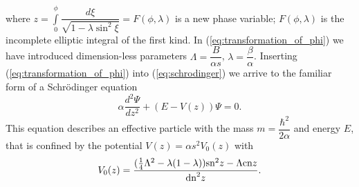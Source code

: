 \documentclass[aps, pre, preprint, groupedaddress, superscriptaddress, showkeys, showpacs] {revtex4-1}
\begin{document}
%
where $z = \int \limits_0^\phi \dfrac{d \xi}{\sqrt{1 - \lambda \sin^2 \xi}} = F(\phi, \lambda)$ is a new phase variable; $F(\phi, \lambda)$ is the incomplete elliptic integral of the first kind.
In (\ref{eq:transformation_of_phi}) we have introduced dimension-less parameters $\Lambda = \dfrac{B}{\alpha s}$, $\lambda = \dfrac{\beta}{\alpha}$.
Inserting (\ref{eq:transformation_of_phi}) into (\ref{eq:schrodinger}) we arrive to the familiar form of a Schr\"odinger equation
% 
\begin{equation}
\alpha \frac{d^2\Psi}{dz^2} + (E - V(z))\Psi = 0.
\label{eq:schrodinger_usual}
\end{equation}
%
This equation describes an effective particle with the mass  $m = \dfrac{\hbar^2}{2 \alpha}$ and energy $E$, that is confined by the potential $V(z) = \alpha s^2 V_0(z)$ with
%
\begin{equation}
V_0(z) = \frac{ (\frac{1}{4} \Lambda^2 - \lambda (1 - \lambda)) \textrm{sn}^2{z} - \Lambda \textrm{cn}{z}}{\textrm{dn}^2{z}}.
\label{eq:potential}
\end{equation}
%
\end{document}
